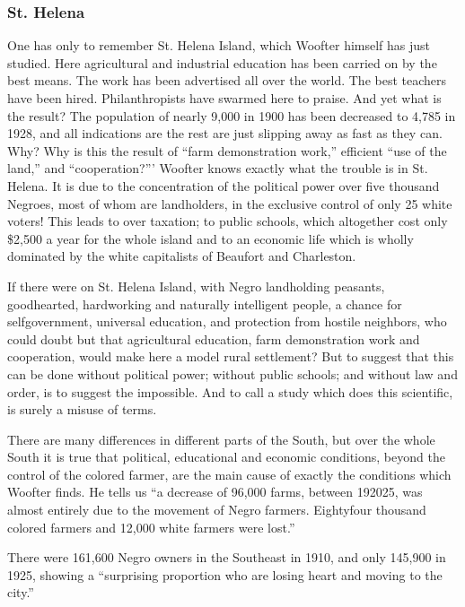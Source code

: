 \documentclass[letterpaper,10pt,english]{jupyterBook}
\begin{document}
\subsubsection{St. Helena}
\label{\detokenize{Volumes/38/03/woofterism:st-helena}}
\sphinxAtStartPar
One has only to remember St. Helena Island, which Woofter himself has just studied. Here agricultural and industrial education has been carried on by the best means. The work has been advertised all over the world. The best teachers have been hired. Philanthropists have swarmed here to praise. And yet what is the result? The population of nearly 9,000 in 1900 has been decreased to 4,785 in 1928, and all indications are the rest are just slipping away as fast as they can. Why? Why is this the result of “farm demonstration work,” efficient “use of the land,” and “co\sphinxhyphen{}operation?”’ Woofter knows exactly what the trouble is in St. Helena. It is due to the concentration of the political power over five thousand Negroes, most of whom are landholders, in the exclusive control of only 25 white voters! This leads to over taxation; to public schools, which altogether cost only \$2,500 a year for the whole island and to an economic life which is wholly dominated by the white capitalists of Beaufort and Charleston.

\sphinxAtStartPar
If there were on St. Helena Island, with Negro landholding peasants, good\sphinxhyphen{}hearted, hard\sphinxhyphen{}working and naturally intelligent people, a chance for self\sphinxhyphen{}government, universal education, and protection from hostile neighbors, who could doubt but that agricultural education, farm demonstration work and co\sphinxhyphen{}operation, would make here a model rural settlement? But to suggest that this can be done without political power; without public schools; and without law and order, is to suggest the impossible. And to call a study which does this scientific, is surely a misuse of terms.

\sphinxAtStartPar
There are many differences in different parts of the South, but over the whole South it is true that political, educational and economic conditions, beyond the control of the colored farmer, are the main cause of exactly the conditions which Woofter finds. He tells us “a decrease of 96,000 farms, between 1920\sphinxhyphen{}25, was almost entirely due to the movement of Negro farmers. Eighty\sphinxhyphen{}four thousand colored farmers and 12,000 white farmers were lost.”

\sphinxAtStartPar
There were 161,600 Negro owners in the Southeast in 1910, and only 145,900 in 1925, showing a “surprising proportion who are losing heart and moving to the city.”
\end{document}

